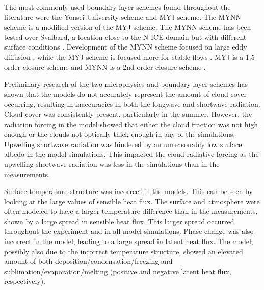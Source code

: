 The most commonly used boundary layer schemes found throughout the literature were the Yonsei University scheme \cite{Hong:2006vc} and MYJ scheme. The MYNN scheme is a modified version of the MYJ scheme. The MYNN scheme has been tested over Svalbard, a location close to the N-ICE domain but with different surface conditions \cite{Pilguj:2018ff}. Development of the MYNN scheme focused on large eddy diffusion \cite{Cohen:2015gp}, while the MYJ scheme is focused more for stable flows \cite{Janjic:1994vv} \cite{Mellor:1982ty}. MYJ is a 1.5-order closure scheme and MYNN is a 2nd-order closure scheme \cite{Pilguj:2018ff}.

Preliminary research of the two microphysics and boundary layer schemes has shown that the models do not accurately represent the amount of cloud cover occurring, resulting in inaccuracies in both the longwave and shortwave radiation. Cloud cover was consistently present, particularly in the summer. However, the radiation forcing in the model showed that either the cloud fraction was not high enough or the clouds not optically thick enough in any of the simulations. Upwelling shortwave radiation was hindered by an unreasonably low surface albedo in the model simulations. This impacted the cloud radiative forcing as the upwelling shortwave radiation was less in the simulations than in the measurements. 

Surface temperature structure was incorrect in the models. This can be seen by looking at the large values of sensible heat flux. The surface and atmosphere were often modeled to have a larger temperature difference than in the measurements, shown by a large spread in sensible heat flux. This larger spread occurred throughout the experiment and in all model simulations. Phase change was also incorrect in the model, leading to a large spread in latent heat flux. The model, possibly also due to the incorrect temperature structure, showed an elevated amount of both deposition/condensation/freezing and sublimation/evaporation/melting (positive and negative latent heat flux, respectively).
